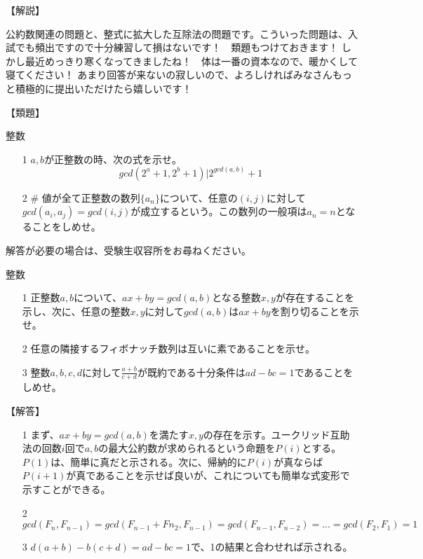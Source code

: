 \documentclass[a4paper,fleqn,dvipdfmx]{jsarticle}
\begin{document}
\begin{flushleft}
【解説】
\end{flushleft}

公約数関連の問題と、整式に拡大した互除法の問題です。こういった問題は、入試でも頻出ですので十分練習して損はないです！　類題もつけておきます！
しかし最近めっきり寒くなってきましたね！　体は一番の資本なので、暖かくして寝てください！
あまり回答が来ないの寂しいので、よろしければみなさんもっと積極的に提出いただけたら嬉しいです！


\begin{flushleft}
【類題】
\end{flushleft}

\begin{itembox}[l]{整数}

\begin{itemize}
    \item [1] 
    $a,b$が正整数の時、次の式を示せ。
    $$gcd(2^a+1,2^b+1)|2^{gcd(a,b)}+1$$
    \item [2] \#
    値が全て正整数の数列$\{a_n\}$について、任意の$(i,j)$に対して$gcd(a_i,a_j)=gcd(i,j)$が成立するという。この数列の一般項は$a_n=n$となることをしめせ。
\end{itemize}

\end{itembox}
解答が必要の場合は、受験生収容所をお尋ねください。



\newpage


\begin{itembox}[l]{整数}

\begin{itemize}
    \item [1] 
    正整数$a,b$について、$ax+by=gcd(a,b)$となる整数$x,y$が存在することを示し、次に、任意の整数$x,y$に対して$gcd(a,b)$は$ax+by$を割り切ることを示せ。
    \item [2] 任意の隣接するフィボナッチ数列は互いに素であることを示せ。
    \item [3] 整数$a,b,c,d$に対して$\frac{a+b}{c+d}$が既約である十分条件は$ad-bc=1$であることをしめせ。
\end{itemize}

\end{itembox}


\begin{flushleft}
【解答】
\end{flushleft}

\begin{itemize}
    \item [1] 
    まず、$ax+by=gcd(a,b)$を満たす$x,y$の存在を示す。ユークリッド互助法の回数$i$回で$a,b$の最大公約数が求められるという命題を$P(i)$とする。$P(1)$は、簡単に真だと示される。次に、帰納的に$P(i)$が真ならば$P(i+1)$が真であることを示せば良いが、これについても簡単な式変形で示すことができる。
    
    \item [2]
    $gcd(F_n,F_{n-1})=gcd(F_{n-1}+F{n_2},F_{n-1})=gcd(F_{n-1},F_{n-2})=...=gcd(F_2,F_1)=1$
    
    \item [3]
    $d(a+b)-b(c+d)=ad-bc=1$で、1の結果と合わせれば示される。
    
\end{itemize}
\end{document}
